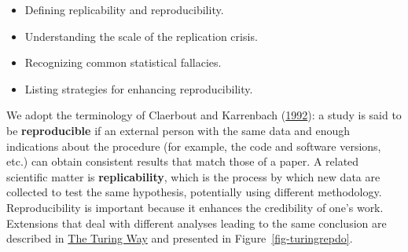 \documentclass[
  11pt,
  letterpaper,
]{scrbook}
\providecommand{\tightlist}{%
  \setlength{\itemsep}{0pt}\setlength{\parskip}{0pt}}\usepackage{longtable,booktabs,array}
\theoremstyle{definition}
\theoremstyle{remark}
\begin{document}
\begin{tcolorbox}[enhanced jigsaw, breakable, toptitle=1mm, left=2mm, bottomrule=.15mm, colframe=quarto-callout-important-color-frame, colback=white, rightrule=.15mm, title=\textcolor{quarto-callout-important-color}{\faExclamation}\hspace{0.5em}{Learning objectives}, opacityback=0, toprule=.15mm, titlerule=0mm, colbacktitle=quarto-callout-important-color!10!white, bottomtitle=1mm, arc=.35mm, coltitle=black, opacitybacktitle=0.6, leftrule=.75mm]

\begin{itemize}
\tightlist
\item
  Defining replicability and reproducibility.
\item
  Understanding the scale of the replication crisis.
\item
  Recognizing common statistical fallacies.
\item
  Listing strategies for enhancing reproducibility.
\end{itemize}

\end{tcolorbox}

We adopt the terminology of Claerbout and Karrenbach
(\protect\hyperlink{ref-Claerboutux2fKarrenbach:1992}{1992}): a study is
said to be \textbf{reproducible} if an external person with the same
data and enough indications about the procedure (for example, the code
and software versions, etc.) can obtain consistent results that match
those of a paper. A related scientific matter is \textbf{replicability},
which is the process by which new data are collected to test the same
hypothesis, potentially using different methodology. Reproducibility is
important because it enhances the credibility of one's work. Extensions
that deal with different analyses leading to the same conclusion are
described in
\href{\%5Bhttps://the-turing-way.netlify.app/reproducible-research/overview/overview-definitions.html\%5D}{The
Turing Way} and presented in Figure~\ref{fig-turingrepdo}.
\end{document}
